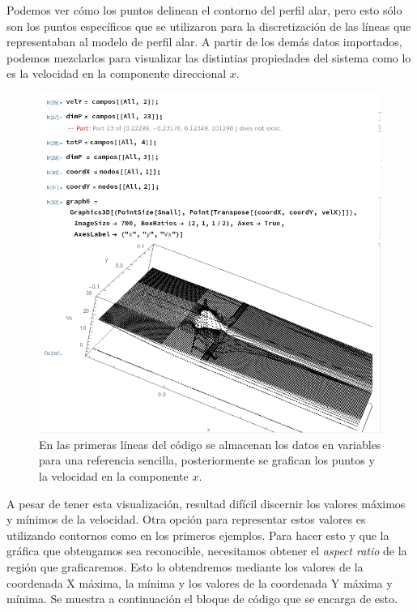 \documentclass[12pt, letterpaper]{article}
\begin{document}
Podemos ver cómo los puntos delinean el contorno del perfil alar, pero esto sólo son los puntos específicos que se utilizaron para la discretización de las líneas que representaban al modelo de perfil alar. A partir de los demás datos importados, podemos mezclarlos para visualizar las distintias propiedades del sistema como lo es la velocidad en la componente direccional $x$.

\begin{figure}[H]
	\centering
	\includegraphics[width=\textwidth]{9.png}
	\caption{En las primeras líneas del código se almacenan los datos en variables para una referencia sencilla, posteriormente se grafican los puntos y la velocidad en la componente $x$.}
\end{figure}

A pesar de tener esta visualización, resultad difícil discernir los valores máximos y mínimos de la velocidad. Otra opción para representar estos valores es utilizando contornos como en los primeros ejemplos. Para hacer esto y que la gráfica que obtengamos sea reconocible, necesitamos obtener el \textit{aspect ratio} de la región que graficaremos. Esto lo obtendremos mediante los valores de la coordenada X máxima, la mínima y los valores de la coordenada Y máxima y mínima. Se muestra a continuación el bloque de código que se encarga de esto.
\end{document}
